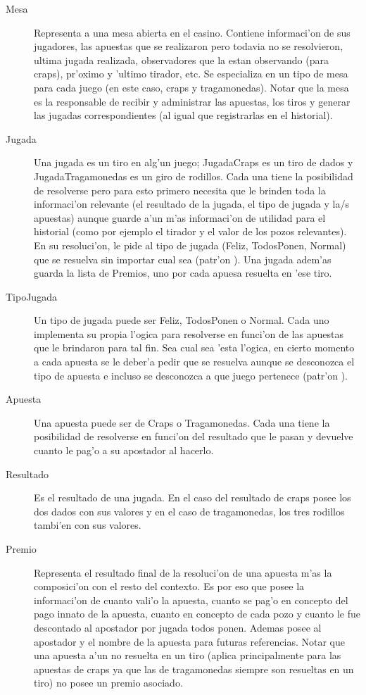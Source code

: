 \begin{description}
\item[Mesa] Representa a una mesa abierta en el casino. Contiene informaci'on de sus jugadores, las apuestas que se realizaron pero todavia no se resolvieron, ultima jugada realizada, observadores que la estan observando (para craps), pr'oximo y 'ultimo tirador, etc. Se especializa en un tipo de mesa para cada juego (en este caso, craps y tragamonedas). Notar que la mesa es la responsable de recibir y administrar las apuestas, los tiros y generar las jugadas correspondientes (al igual que registrarlas en el historial).

\item[Jugada] Una jugada es un tiro en alg'un juego; JugadaCraps es un tiro de dados y JugadaTragamonedas es un giro de rodillos. Cada una tiene la posibilidad de resolverse pero para esto primero necesita que le brinden toda la informaci'on relevante (el resultado de la jugada, el tipo de jugada y la/s apuestas) aunque guarde a'un m'as informaci'on de utilidad para el historial (como por ejemplo el tirador y el valor de los pozos relevantes). En su resoluci'on, le pide al tipo de jugada (Feliz, TodosPonen, Normal) que se resuelva sin importar cual sea (patr'on ). Una jugada adem'as guarda la lista de Premios, uno por cada apuesa resuelta en 'ese tiro.

\item[TipoJugada] Un tipo de jugada puede ser Feliz, TodosPonen o Normal. Cada uno implementa su propia l'ogica para resolverse en funci'on de las apuestas que le brindaron para tal fin. Sea cual sea 'esta l'ogica, en cierto momento a cada apuesta se le deber'a pedir que se resuelva aunque se desconozca el tipo de apuesta e incluso se desconozca a que juego pertenece (patr'on ).

\item[Apuesta] Una apuesta puede ser de Craps o Tragamonedas. Cada una tiene la posibilidad de resolverse en funci'on del resultado que le pasan y devuelve cuanto le pag'o a su apostador al hacerlo.

\item[Resultado] Es el resultado de una jugada. En el caso del resultado de craps posee los dos dados con sus valores y en el caso de tragamonedas, los tres rodillos tambi'en con sus valores.

\item[Premio] Representa el resultado final de la resoluci'on de una apuesta m'as la composici'on con el resto del contexto. Es por eso que posee la informaci'on de cuanto vali'o la apuesta, cuanto se pag'o en concepto del pago innato de la apuesta, cuanto en concepto de cada pozo y cuanto le fue descontado al apostador por jugada todos ponen. Ademas posee al apostador y el nombre de la apuesta para futuras referencias. Notar que una apuesta a'un no resuelta en un tiro (aplica principalmente para las apuestas de craps ya que las de tragamonedas siempre son resueltas en un tiro) no posee un premio asociado.


\end{description}
